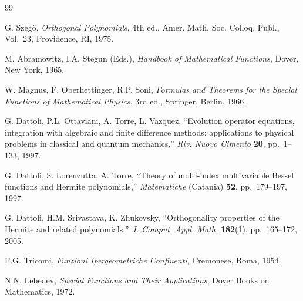 \begin{thebibliography}{99}

G. Szeg\H{o}, \emph{Orthogonal Polynomials}, 4th ed.,
Amer. Math. Soc. Colloq. Publ., Vol.~23, Providence, RI, 1975.

M. Abramowitz, I.A. Stegun (Eds.),
\emph{Handbook of Mathematical Functions},
Dover, New York, 1965.

W. Magnus, F. Oberhettinger, R.P. Soni,
\emph{Formulas and Theorems for the Special Functions of Mathematical Physics},
3rd ed., Springer, Berlin, 1966.

G. Dattoli, P.L. Ottaviani, A. Torre, L. Vazquez,
``Evolution operator equations, integration with algebraic and finite difference
methods: applications to physical problems in classical and quantum
mechanics,''
\emph{Riv. Nuovo Cimento} \textbf{20}, pp.~1--133, 1997.

G. Dattoli, S. Lorenzutta, A. Torre,
``Theory of multi-index multivariable Bessel functions and Hermite
polynomials,''
\emph{Matematiche} (Catania) \textbf{52}, pp.~179--197, 1997.

G. Dattoli, H.M. Srivastava, K. Zhukovsky,
``Orthogonality properties of the Hermite and related polynomials,''
\emph{J. Comput. Appl. Math.} \textbf{182}(1), pp.~165--172, 2005.

F.G. Tricomi,
\emph{Funzioni Ipergeometriche Confluenti},
Cremonese, Roma, 1954.

N.N. Lebedev,
\emph{Special Functions and Their Applications},
Dover Books on Mathematics, 1972.

\end{thebibliography}
